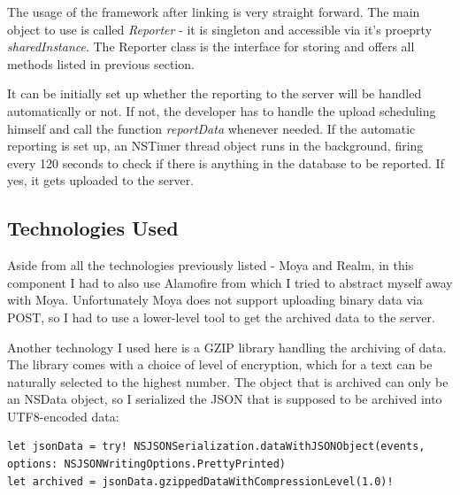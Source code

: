 The usage of the framework after linking is very straight forward. The main object to use is called \emph{Reporter} - it is singleton and accessible via it's proeprty \emph{sharedInstance}. The Reporter class is the interface for storing and offers all methods listed in previous section.

It can be initially set up whether the reporting to the server will be handled automatically or not. If not, the developer has to handle the upload scheduling himself and call the function \emph{reportData} whenever needed. If the automatic reporting is set up, an NSTimer thread object runs in the background, firing every 120 seconds to check if there is anything in the database to be reported. If yes, it gets uploaded to the server.

\subsection{Technologies Used}

Aside from all the technologies previously listed - Moya and Realm, in this component I had to also use Alamofire from which I tried to abstract myself away with Moya. Unfortunately Moya does not support uploading binary data via POST, so I had to use a lower-level tool to get the archived data to the server.

Another technology I used here is a GZIP library handling the archiving of data. The library comes with a choice of level of encryption, which for a text can be naturally selected to the highest number. The object that is archived can only be an NSData object, so I serialized the JSON that is supposed to be archived into UTF8-encoded data:

\bigbreak

\begin{lstlisting}
let jsonData = try! NSJSONSerialization.dataWithJSONObject(events, options: NSJSONWritingOptions.PrettyPrinted)
let archived = jsonData.gzippedDataWithCompressionLevel(1.0)!
\end{lstlisting}	
